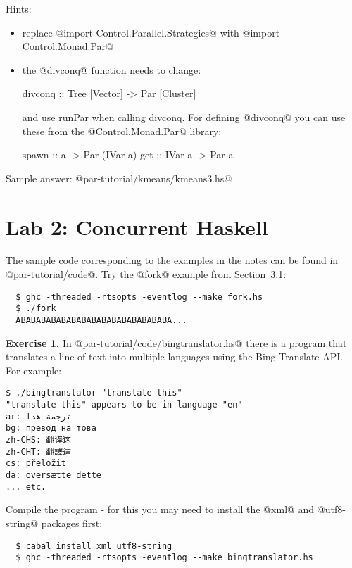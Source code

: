 \documentclass[11pt,a4paper]{article}
\newcommand{\Section}[2]{\section{#2}\label{sec:#1}}
\begin{document}
Hints:
\begin{itemize}
\item replace @import Control.Parallel.Strategies@ with
    @import Control.Monad.Par@

\item the @divconq@ function needs to change:

  \begin{haskell}
      divconq :: Tree [Vector] -> Par [Cluster]
  \end{haskell}

    \noindent and use runPar when calling divconq.  For defining @divconq@ you
    can use these from the @Control.Monad.Par@ library:

  \begin{haskell}
      spawn :: a -> Par (IVar a)
      get   :: IVar a -> Par a
  \end{haskell}
\end{itemize}

Sample answer: @par-tutorial/kmeans/kmeans3.hs@

\newpage\Section{conc}{Lab 2: Concurrent Haskell}

The sample code corresponding to the examples in the notes can be
found in @par-tutorial/code@.  Try the @fork@ example from
Section~3.1:

{\small \begin{verbatim}
  $ ghc -threaded -rtsopts -eventlog --make fork.hs
  $ ./fork
  ABABABABABABABABABABABABABABABA...
\end{verbatim}}

\textbf{Exercise 1.} In @par-tutorial/code/bingtranslator.hs@ there is
a program that translates a line of text into multiple languages using
the Bing Translate API.  For example:

{\small \begin{verbatim}
$ ./bingtranslator "translate this"
"translate this" appears to be in language "en"
ar: ترجمة هذا
bg: превод на това
zh-CHS: 翻译这
zh-CHT: 翻譯這
cs: přeložit
da: oversætte dette
... etc.
\end{verbatim}}

\noindent Compile the program - for this you may
need to install the @xml@ and @utf8-string@ packages first:

{\small \begin{verbatim}
  $ cabal install xml utf8-string
  $ ghc -threaded -rtsopts -eventlog --make bingtranslator.hs
\end{verbatim}}
\end{document}

